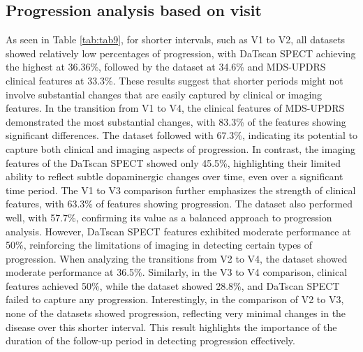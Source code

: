 \documentclass[twocolumn]{article}
\begin{document}
\subsection{Progression analysis based on visit}
As seen in Table \ref{tab:tab9}, for shorter intervals, such as V1 to V2, all datasets showed relatively low percentages of progression, with DaTscan SPECT achieving the highest at 36.36\%, followed by the dataset at 34.6\% and MDS-UPDRS clinical features at 33.3\%. These results suggest that shorter periods might not involve substantial changes that are easily captured by clinical or imaging features. In the transition from V1 to V4, the clinical features of MDS-UPDRS demonstrated the most substantial changes, with 83.3\% of the features showing significant differences. The dataset followed with 67.3\%, indicating its potential to capture both clinical and imaging aspects of progression. In contrast, the imaging features of the DaTscan SPECT showed only 45.5\%, highlighting their limited ability to reflect subtle dopaminergic changes over time, even over a significant time period. The V1 to V3 comparison further emphasizes the strength of clinical features, with 63.3\% of features showing progression. The dataset also performed well, with 57.7\%, confirming its value as a balanced approach to progression analysis. However, DaTscan SPECT features exhibited moderate performance at 50\%, reinforcing the limitations of imaging in detecting certain types of progression. When analyzing the transitions from V2 to V4, the dataset showed moderate performance at 36.5\%. Similarly, in the V3 to V4 comparison, clinical features achieved 50\%, while the dataset showed 28.8\%, and DaTscan SPECT failed to capture any progression. Interestingly, in the comparison of V2 to V3, none of the datasets showed progression, reflecting very minimal changes in the disease over this shorter interval. This result highlights the importance of the duration of the follow-up period in detecting progression effectively.
\end{document}
